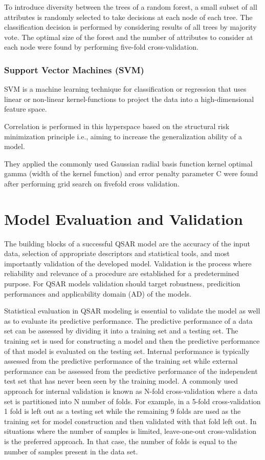 To introduce diversity between the trees of a random forest, a small subset of all attributes is randomly selected to take decisions at each node of each tree. The classification decision is performed by considering results of all trees by majority vote. The optimal size of the forest and the number of attributes to consider at each node were found by performing five-fold cross-validation. \cite{Lapins2013}

\subsubsection{Support Vector Machines (SVM)}
SVM is a machine learning technique for classification or regression that uses linear or non-linear kernel-functions to project the data into a high-dimensional feature space. \cite{Lapins2013}

Correlation is performed in this hyperspace based on the structural risk minimization principle i.e., aiming to increase the generalization ability of a model. \cite{Lapins2013}

They applied the commonly used Gaussian radial basis function kernel optimal gamma (width of the kernel function) and error penalty parameter C were found after performing grid search on five­fold cross validation. \cite{Lapins2013}


\section{Model Evaluation and Validation}

The building blocks of a successful QSAR model are the accuracy of the input data, selection of appropriate descriptors and statistical tools, and most importantly validation of the developed model. Validation is the process where reliability and relevance of a procedure are established for a predetermined purpose. For QSAR models validation should target robustness, predicition performances and applicability domain (AD) of the models. \cite{Lapins2013}

Statistical evaluation in QSAR modeling is essential to validate the model as well as to evaluate its predictive performance. The predictive performance of a data set can be assessed by dividing it into a training set and a testing set. The training set is used for constructing a model and then the predictive performance of that model is evaluated on the testing set. Internal performance is typically assessed from the predictive performance of the training set while external performance can be assessed from the predictive performance of the independent test set that has never been seen by the training model. A commonly used approach for internal validation is known as N-fold cross-validation where a data set is partitioned into N number of folds. For example, in a 5-fold cross-validation 1 fold is left out as a testing set while the remaining 9 folds are used as the training set for model construction and then validated with that fold left out. In situations where the number of samples is limited, leave-one-out cross-validation is the preferred approach. In that case, the number of folds is equal to the number of samples present in the data set. \cite{Nantasenamat2009}

